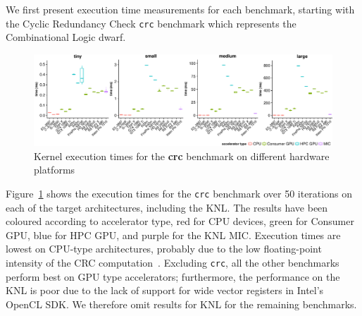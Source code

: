 \documentclass[../document.tex]{subfiles}
\begin{document}
\label{ssec:time}
	
We first present execution time measurements for each benchmark, starting with the Cyclic Redundancy Check {\tt crc} benchmark which represents the Combinational Logic dwarf.

\newcommand{\plotwidth}{0.24\textwidth}

\begin{figure}[t]
	\centering
	\includegraphics[width=\textwidth,keepaspectratio]{figures/new-time-results/generate_crc_row_bandwplot}
	\caption{Kernel execution times for the {\bf crc} benchmark on different hardware platforms}
	\label{fig:time-crc}
\end{figure}



Figure~\ref{fig:time-crc} shows the execution times for the {\tt crc} benchmark over 50 iterations on each of the target architectures, including the KNL.
The results have been coloured according to accelerator type, red for CPU devices, green for Consumer GPU, blue for HPC GPU, and purple for the KNL MIC.
Execution times are lowest on CPU-type architectures, probably due to the low floating-point intensity of the CRC computation~\cite[Ch. 6]{joshi2016thesis}.
Excluding {\tt crc}, all the other benchmarks perform best on GPU type accelerators; furthermore, the performance on the KNL is poor due to the lack of support for wide vector registers in Intel's OpenCL SDK.
We therefore omit results for KNL for the remaining benchmarks.

\end{document}
